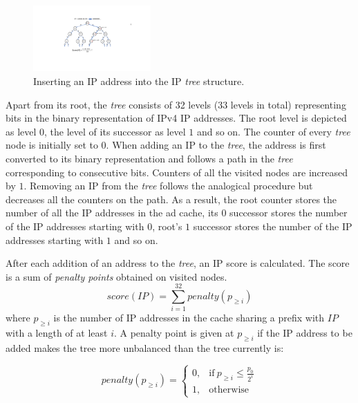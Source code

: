 \begin{figure}
    \centering
    \includegraphics[width=0.40\textwidth]{img/ip_tree_small}
    \vspace{-0.05in}
    \caption{Inserting an IP address into the IP \emph{tree} structure.}
    \label{fig:ip_tree}
    \vspace{-0.15in}
\end{figure}

Apart from its root, the \emph{tree} consists of 32 levels (33 levels in total) representing bits in the binary representation of IPv4 IP addresses. 
The root level is depicted as level $0$, the level of its successor as level $1$ and so on. 
The counter of every \emph{tree} node is initially set to $0$. When adding an IP to the \emph{tree}, the address is first converted to its binary representation and follows a path in the \emph{tree} corresponding to consecutive bits. 
Counters of all the visited nodes are increased by $1$. Removing an IP from the \emph{tree} follows the analogical procedure but decreases all the counters on the path. 
As a result, the root counter stores the number of all the  IP addresses in the ad cache, its $0$ successor stores the number of the IP addresses starting with $0$, root's $1$ successor stores the number of the IP addresses starting with $1$ and so on. 

After each addition of an address to the \emph{tree}, an IP score is calculated.
The score is a sum of \emph{penalty points} obtained on visited nodes. 
$$score(IP)=\sum_{i=1}^{32} \textit{penalty}(p_{\geq i}) $$
where $p_{\geq i}$ is the number of IP addresses in the cache sharing a prefix with $IP$ with a length of at least $i$. A penalty point is given at $p_{\geq i}$ if the IP address to be added makes the tree more unbalanced than the tree currently is:

\begin{equation}
    \textit{penalty}(p_{\geq i})=
    \begin{cases}
      0, & \text{if}\ p_{\geq i} \leq \frac{p_0}{2^i} \\
      1, & \text{otherwise}
    \end{cases}
  \end{equation}

